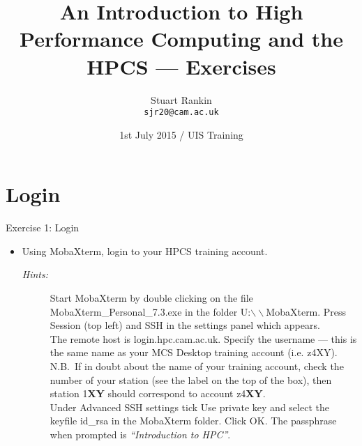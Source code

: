 \documentclass{beamer}
\title[HPC: An introduction --- Exercises] %
{An Introduction to High Performance Computing and the HPCS --- Exercises}
\author[SJ Rankin] %
{Stuart Rankin\\ \texttt{sjr20@cam.ac.uk}}
\institute[HPCS, University of Cambridge] %
{High Performance Computing Service (http://www.hpc.cam.ac.uk/)\\
University Information Services (http://www.uis.cam.ac.uk/)}
\date[01/07/2015] %
{1st July 2015 / UIS Training}
\begin{document}
\begin{frame}
  \titlepage
\end{frame}

\section{Login}
\begin{frame}{Exercise 1: Login}
\begin{itemize}
\item{Using MobaXterm, login to your HPCS training account.}
\begin{description}
\item[\emph{Hints:}]{\small Start MobaXterm by double clicking on the file \alert{MobaXterm\_Personal\_7.3.exe} in the folder U:$\backslash\backslash$MobaXterm. Press \alert{Session} (top left) and \alert{SSH} in the settings panel which appears.\\\smallskip
The remote host is \alert{login.hpc.cam.ac.uk}. Specify the username --- this is the same name as your MCS Desktop training account (i.e. \alert{z4XY}).\hfill\\\smallskip
{\scriptsize N.B.\ If in doubt about the name of your training account, check the number of your station (see the label on the top of the box), then station 1\textbf{XY} should correspond to account z4\textbf {XY}.}\hfill\\\smallskip
Under \alert{Advanced SSH settings} tick \alert{Use private key} and select the keyfile \alert{id\_rsa} in the MobaXterm folder. Click OK. The passphrase when prompted is \alert{\emph{``Introduction to HPC''}}.}
\end{description}
\end{itemize}
\end{frame}
\end{document}
